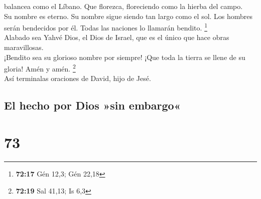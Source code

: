 balancea como el Líbano. Que florezca, floreciendo como la hierba del
campo.\\
 Su nombre es eterno. Su nombre sigue siendo tan largo
como el sol. Los hombres serán bendecidos por él. Todas las naciones lo
llamarán bendito. \footnote{\textbf{72:17} Gén 12,3; Gén 22,18}\\
 Alabado sea Yahvé Dios, el Dios de Israel, que es el
único que hace obras maravillosas.\\
 ¡Bendito sea su glorioso nombre por siempre! ¡Que toda
la tierra se llene de su gloria! Amén y amén. \footnote{\textbf{72:19}
  Sal 41,13; Is 6,3}\\
 Así terminalas oraciones de David, hijo de Jesé.

\hypertarget{el-hecho-por-dios-sin-embargo}{%
\subsection{El hecho por Dios »sin
embargo«}\label{el-hecho-por-dios-sin-embargo}}

\hypertarget{section-71}{%
\section{73}\label{section-71}}

